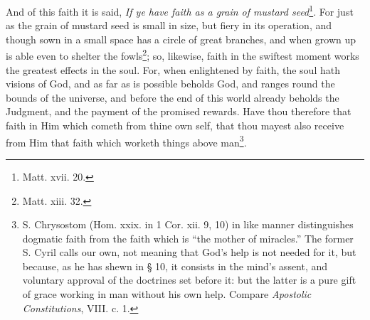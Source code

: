 And of this faith it is said, \emph{If ye have faith as a grain of mustard seed}\footnote{Matt. xvii. 20.}. For just as the grain of mustard seed is small in size, but fiery in its operation, and though sown in a small space has a circle of great branches, and when grown up is able even to shelter the fowls\footnote{Matt. xiii. 32.}; so, likewise, faith in the swiftest moment works the greatest effects in the soul. For, when enlightened by faith, the soul hath visions of God, and as far as is possible beholds God, and ranges round the bounds of the universe, and before the end of this world already beholds the Judgment, and the payment of the promised rewards. Have thou therefore that faith in Him which cometh from thine own self, that thou mayest also receive from Him that faith which worketh things above man\footnote{S. Chrysostom (Hom. xxix. in 1 Cor. xii. 9, 10) in like manner distinguishes dogmatic faith from the faith which is “the mother of miracles.” The former S. Cyril calls our own, not meaning that God’s help is not needed for it, but because, as he has shewn in § 10, it consists in the mind’s assent, and voluntary approval of the doctrines set before it: but the latter is a pure gift of grace working in man without his own help. Compare \emph{Apostolic Constitutions}, VIII. c. 1.}.

